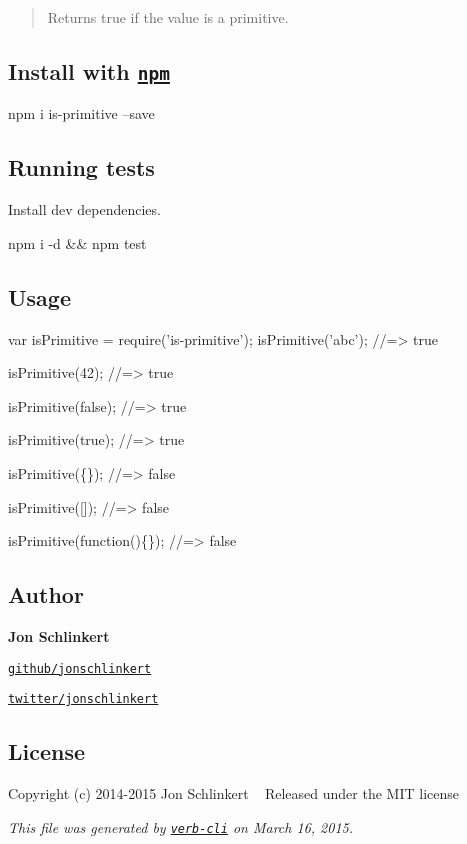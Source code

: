 \begin{quote}
Returns {\ttfamily true} if the value is a primitive. \end{quote}


\subsection*{Install with \href{npmjs.org}{\tt npm}}


\begin{DoxyCode}
npm i is-primitive --save
\end{DoxyCode}


\subsection*{Running tests}

Install dev dependencies.


\begin{DoxyCode}
npm i -d && npm test
\end{DoxyCode}


\subsection*{Usage}


\begin{DoxyCode}
var isPrimitive = require('is-primitive');
isPrimitive('abc');
//=> true

isPrimitive(42);
//=> true

isPrimitive(false);
//=> true

isPrimitive(true);
//=> true

isPrimitive(\{\});
//=> false

isPrimitive([]);
//=> false

isPrimitive(function()\{\});
//=> false
\end{DoxyCode}


\subsection*{Author}

{\bfseries Jon Schlinkert}


\begin{DoxyItemize}
\item \href{https://github.com/jonschlinkert}{\tt github/jonschlinkert}
\item \href{http://twitter.com/jonschlinkert}{\tt twitter/jonschlinkert}
\end{DoxyItemize}

\subsection*{License}

Copyright (c) 2014-\/2015 Jon Schlinkert ~\newline
Released under the M\+IT license





{\itshape This file was generated by \href{https://github.com/assemble/verb-cli}{\tt verb-\/cli} on March 16, 2015.} 